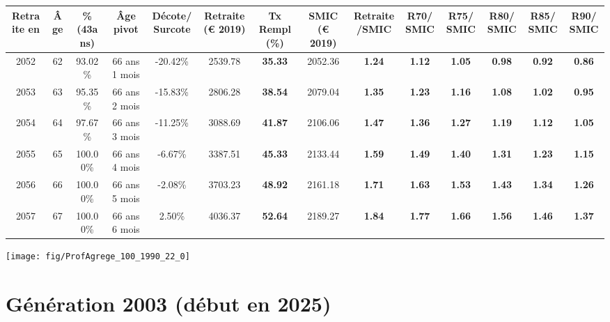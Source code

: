 \begin{adjustbox}{max width=\textwidth} 
\begin{tabular}[htb]{|c|c||c|c|c||c|c||c|c||c|c|c|c|c|} 
\hline 
 Retraite en &  Âge &  \%(43ans) &  Âge pivot &  Décote/Surcote &  Retraite (\euro{} 2019) &  Tx Rempl(\%) &  SMIC (\euro{} 2019) &  Retraite/SMIC &  R70/SMIC &  R75/SMIC &  R80/SMIC &  R85/SMIC &  R90/SMIC \\ 
\hline \hline 
 2052 &  62 &  93.02\% &  66 ans 1 mois &  -20.42\% &  2539.78 &  {\bf 35.33} &  2052.36 &  {\bf 1.24} &  {\bf 1.12} &  {\bf 1.05} &  {\bf {\color{red} 0.98}} &  {\bf {\color{red} 0.92}} &  {\bf {\color{red} 0.86}} \\ 
\hline 
 2053 &  63 &  95.35\% &  66 ans 2 mois &  -15.83\% &  2806.28 &  {\bf 38.54} &  2079.04 &  {\bf 1.35} &  {\bf 1.23} &  {\bf 1.16} &  {\bf 1.08} &  {\bf 1.02} &  {\bf {\color{red} 0.95}} \\ 
\hline 
 2054 &  64 &  97.67\% &  66 ans 3 mois &  -11.25\% &  3088.69 &  {\bf 41.87} &  2106.06 &  {\bf 1.47} &  {\bf 1.36} &  {\bf 1.27} &  {\bf 1.19} &  {\bf 1.12} &  {\bf 1.05} \\ 
\hline 
 2055 &  65 &  100.00\% &  66 ans 4 mois &  -6.67\% &  3387.51 &  {\bf 45.33} &  2133.44 &  {\bf 1.59} &  {\bf 1.49} &  {\bf 1.40} &  {\bf 1.31} &  {\bf 1.23} &  {\bf 1.15} \\ 
\hline 
 2056 &  66 &  100.00\% &  66 ans 5 mois &  -2.08\% &  3703.23 &  {\bf 48.92} &  2161.18 &  {\bf 1.71} &  {\bf 1.63} &  {\bf 1.53} &  {\bf 1.43} &  {\bf 1.34} &  {\bf 1.26} \\ 
\hline 
 2057 &  67 &  100.00\% &  66 ans 6 mois &  2.50\% &  4036.37 &  {\bf 52.64} &  2189.27 &  {\bf 1.84} &  {\bf 1.77} &  {\bf 1.66} &  {\bf 1.56} &  {\bf 1.46} &  {\bf 1.37} \\ 
\hline 
\hline 
\end{tabular} 
\end{adjustbox} 
 
 \vspace{0.1cm} 

 {\hspace{-2.2cm}\texttt{[image: fig/ProfAgrege\_100\_1990\_22\_0]}} 

\newpage 
 
\section{Génération 2003 (début en 2025)\label{ProfAgrege_100_2003_22_0}} 
 
